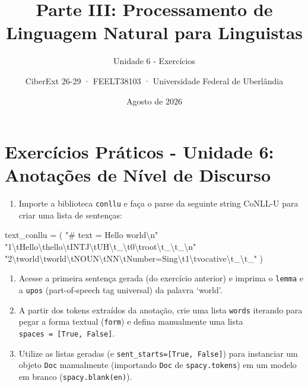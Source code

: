 \documentclass[
  brazilian,
]{article}
\title{Parte III: Processamento de Linguagem Natural para Linguistas}
\subtitle{Unidade 6 - Exercícios}
\author{CiberExt 26-29 · FEELT38103 · Universidade Federal de
Uberlândia}
\date{Agosto de 2026}
\newenvironment{Shaded}{}{}
\newcommand{\CharTok}[1]{\textcolor[rgb]{0.25,0.44,0.63}{#1}}
\newcommand{\NormalTok}[1]{#1}
\newcommand{\OperatorTok}[1]{\textcolor[rgb]{0.40,0.40,0.40}{#1}}
\newcommand{\StringTok}[1]{\textcolor[rgb]{0.25,0.44,0.63}{#1}}
\providecommand{\tightlist}{%
  \setlength{\itemsep}{0pt}\setlength{\parskip}{0pt}}
\begin{document}
\maketitle

\hypertarget{exercuxedcios-pruxe1ticos---unidade-6-anotauxe7uxf5es-de-nuxedvel-de-discurso}{%
\section{Exercícios Práticos - Unidade 6: Anotações de Nível de
Discurso}\label{exercuxedcios-pruxe1ticos---unidade-6-anotauxe7uxf5es-de-nuxedvel-de-discurso}}

\begin{enumerate}
\def\labelenumi{\arabic{enumi}.}
\tightlist
\item
  Importe a biblioteca \texttt{conllu} e faça o parse da seguinte string
  CoNLL-U para criar uma lista de sentenças:
\end{enumerate}

\begin{Shaded}
\begin{Highlighting}[]
\NormalTok{text\_conllu }\OperatorTok{=}\NormalTok{ (}
    \StringTok{"\# text = Hello world}\CharTok{\textbackslash{}n}\StringTok{"}
    \StringTok{"1}\CharTok{\textbackslash{}t}\StringTok{Hello}\CharTok{\textbackslash{}t}\StringTok{hello}\CharTok{\textbackslash{}t}\StringTok{INTJ}\CharTok{\textbackslash{}t}\StringTok{UH}\CharTok{\textbackslash{}t}\StringTok{\_}\CharTok{\textbackslash{}t}\StringTok{0}\CharTok{\textbackslash{}t}\StringTok{root}\CharTok{\textbackslash{}t}\StringTok{\_}\CharTok{\textbackslash{}t}\StringTok{\_}\CharTok{\textbackslash{}n}\StringTok{"}
    \StringTok{"2}\CharTok{\textbackslash{}t}\StringTok{world}\CharTok{\textbackslash{}t}\StringTok{world}\CharTok{\textbackslash{}t}\StringTok{NOUN}\CharTok{\textbackslash{}t}\StringTok{NN}\CharTok{\textbackslash{}t}\StringTok{Number=Sing}\CharTok{\textbackslash{}t}\StringTok{1}\CharTok{\textbackslash{}t}\StringTok{vocative}\CharTok{\textbackslash{}t}\StringTok{\_}\CharTok{\textbackslash{}t}\StringTok{\_"}
\NormalTok{)}
\end{Highlighting}
\end{Shaded}

\begin{enumerate}
\def\labelenumi{\arabic{enumi}.}
\setcounter{enumi}{1}
\item
  Acesse a primeira sentença gerada (do exercício anterior) e imprima o
  \texttt{lemma} e a \texttt{upos} (part-of-speech tag universal) da
  palavra `world'.
\item
  A partir dos tokens extraídos da anotação, crie uma lista
  \texttt{words} iterando para pegar a forma textual (\texttt{form}) e
  defina manualmente uma lista \texttt{spaces\ =\ {[}True,\ False{]}}.
\item
  Utilize as listas geradas (e \texttt{sent\_starts={[}True,\ False{]}})
  para instanciar um objeto \texttt{Doc} manualmente (importando
  \texttt{Doc} de \texttt{spacy.tokens}) em um modelo em branco
  (\texttt{spacy.blank(\textquotesingle{}en\textquotesingle{})}).
\end{enumerate}
\end{document}
